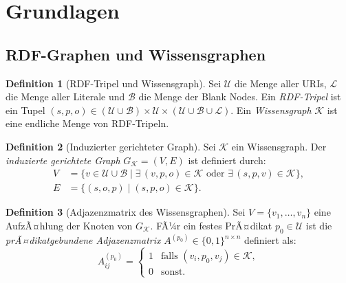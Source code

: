 ﻿\documentclass[a4paper,12pt]{article}
\theoremstyle{definition}
\newtheorem{definition}{Definition}
\begin{document}
\section{Grundlagen}
\label{sec:grundlagen}

\subsection{RDF-Graphen und Wissensgraphen}

\begin{definition}[RDF-Tripel und Wissensgraph]
Sei $\mathcal{U}$ die Menge aller URIs, $\mathcal{L}$ die Menge aller Literale und
$\mathcal{B}$ die Menge der Blank Nodes. Ein \emph{RDF-Tripel} ist ein Tupel
$(s, p, o) \in (\mathcal{U} \cup \mathcal{B}) \times \mathcal{U}
\times (\mathcal{U} \cup \mathcal{B} \cup \mathcal{L})$.
Ein \emph{Wissensgraph} $\mathcal{K}$ ist eine endliche Menge von RDF-Tripeln.
\end{definition}

\begin{definition}[Induzierter gerichteter Graph]
Sei $\mathcal{K}$ ein Wissensgraph. Der \emph{induzierte gerichtete Graph}
$G_{\mathcal{K}} = (V, E)$ ist definiert durch:
\begin{align*}
  V &= \{v \in \mathcal{U} \cup \mathcal{B} \mid \exists\, (v,p,o) \in \mathcal{K}
       \text{ oder } \exists\, (s,p,v) \in \mathcal{K}\}, \\
  E &= \{(s, o, p) \mid (s, p, o) \in \mathcal{K}\}.
\end{align*}
\end{definition}

\begin{definition}[Adjazenzmatrix des Wissensgraphen]
Sei $V = \{v_1, \ldots, v_n\}$ eine AufzÃ¤hlung der Knoten von $G_{\mathcal{K}}$.
FÃ¼r ein festes PrÃ¤dikat $p_0 \in \mathcal{U}$ ist die \emph{prÃ¤dikatgebundene
Adjazenzmatrix} $A^{(p_0)} \in \{0,1\}^{n \times n}$ definiert als:
\[
  A^{(p_0)}_{ij} = \begin{cases}
    1 & \text{falls } (v_i, p_0, v_j) \in \mathcal{K}, \\
    0 & \text{sonst}.
  \end{cases}
\]
\end{definition}
\end{document}
